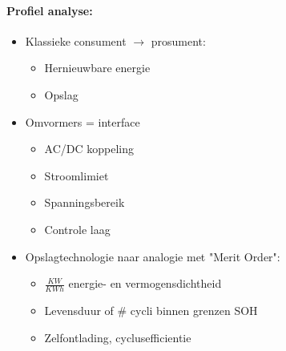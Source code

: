 \documentclass[12pt]{article}
\begin{document}
\paragraph{Profiel analyse:}
\begin{itemize}
    \item Klassieke consument $\rightarrow$ prosument:\begin{itemize}
        \item Hernieuwbare energie 
        \item Opslag
    \end{itemize}
    \item Omvormers = interface\begin{itemize}
        \item AC/DC koppeling 
        \item Stroomlimiet 
        \item Spanningsbereik 
        \item Controle laag 
    \end{itemize}
    \item Opslagtechnologie naar analogie met "Merit Order":\begin{itemize}
        \item $\frac{KW}{KWh}$ energie- en vermogensdichtheid
        \item Levensduur of \# cycli binnen grenzen SOH 
        \item Zelfontlading, cyclusefficientie
    \end{itemize}
\end{itemize}
\end{document}
